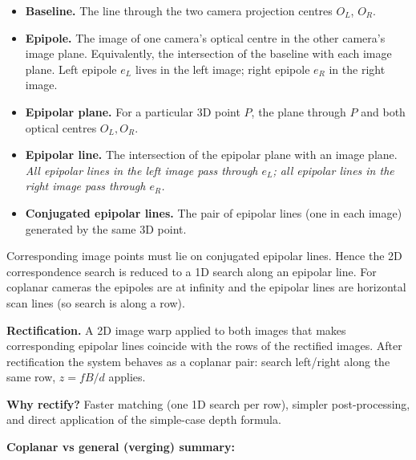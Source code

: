 \begin{defbox}
\begin{itemize}
  \item \textbf{Baseline.} The line through the two camera projection centres $O_L$, $O_R$.
  \item \textbf{Epipole.} The image of one camera's optical centre in the other camera's image plane. Equivalently, the intersection of the baseline with each image plane. Left epipole $e_L$ lives in the left image; right epipole $e_R$ in the right image.
  \item \textbf{Epipolar plane.} For a particular 3D point $P$, the plane through $P$ and both optical centres $O_L, O_R$.
  \item \textbf{Epipolar line.} The intersection of the epipolar plane with an image plane. \emph{All epipolar lines in the left image pass through $e_L$; all epipolar lines in the right image pass through $e_R$.}
  \item \textbf{Conjugated epipolar lines.} The pair of epipolar lines (one in each image) generated by the same 3D point.
\end{itemize}
\end{defbox}

\begin{thmbox}
Corresponding image points must lie on conjugated epipolar lines. Hence the 2D correspondence search is reduced to a 1D search along an epipolar line. For coplanar cameras the epipoles are at infinity and the epipolar lines are horizontal scan lines (so search is along a row).
\end{thmbox}

\separator

\textbf{Rectification.} A 2D image warp applied to both images that makes corresponding epipolar lines coincide with the rows of the rectified images. After rectification the system behaves as a coplanar pair: search left/right along the same row, $z = fB/d$ applies.

\textbf{Why rectify?} Faster matching (one 1D search per row), simpler post-processing, and direct application of the simple-case depth formula.

\separator

\textbf{Coplanar vs general (verging) summary:}

